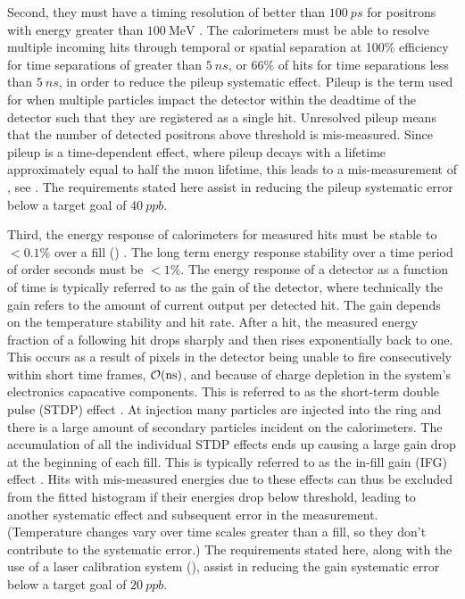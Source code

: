 Second, they must have a timing resolution of better than $\SI{100}{ps}$ for positrons with energy greater than $\SI{100}{\MeV}$ \cite{TDR}. The calorimeters must be able to resolve multiple incoming hits through temporal or spatial separation at 100\% efficiency for time separations of greater than $\SI{5}{ns}$, or 66\% of hits for time separations less than $\SI{5}{ns}$, in order to reduce the pileup systematic effect. Pileup is the term used for when multiple particles impact the detector within the deadtime of the detector such that they are registered as a single hit. Unresolved pileup means that the number of detected positrons above threshold is mis-measured. Since pileup is a time-dependent effect, where pileup decays with a lifetime approximately equal to half the muon lifetime, this leads to a mis-measurement of \wa, see . The requirements stated here assist in reducing the pileup systematic error below a target goal of $\SI{40}{ppb}$.

Third, the energy response of calorimeters for measured hits must be stable to $< 0.1\%$ over a fill () \cite{TDR}. The long term energy response stability over a time period of order seconds must be $< 1\%$. The energy response of a detector as a function of time is typically referred to as the gain of the detector, where technically the gain refers to the amount of current output per detected hit. The gain depends on the temperature stability and hit rate. After a hit, the measured energy fraction of a following hit drops sharply and then rises exponentially back to one. This occurs as a result of pixels in the detector being unable to fire consecutively within short time frames, $\mathcal{O}(\SI{}{ns})$, and because of charge depletion in the system's electronics capacative components. This is referred to as the short-term double pulse (STDP) effect \cite{STDP}. At injection many particles are injected into the ring and there is a large amount of secondary particles incident on the calorimeters. The accumulation of all the individual STDP effects ends up causing a large gain drop at the beginning of each fill. This is typically referred to as the in-fill gain (IFG) effect \cite{IFG}. Hits with mis-measured energies due to these effects can thus be excluded from the fitted histogram if their energies drop below threshold, leading to another systematic effect and subsequent error in the \wa measurement. (Temperature changes vary over time scales greater than a fill, so they don't contribute to the systematic error.) The requirements stated here, along with the use of a laser calibration system (), assist in reducing the gain systematic error below a target goal of $\SI{20}{ppb}$.



